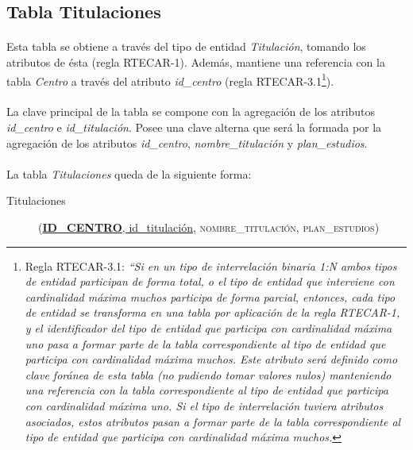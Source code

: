    \subsection{Tabla Titulaciones}

      \paragraph{}Esta tabla se obtiene a través del tipo de entidad
      \textit{Titulación}, tomando los atributos de ésta (regla RTECAR-1).
      Además, mantiene una referencia con la tabla \textit{Centro} a través
      del atributo \textit{id\_centro} (regla RTECAR-3.1\footnote{Regla
      RTECAR-3.1: \textit{``Si en un tipo de interrelación binaria 1:N ambos
      tipos de entidad participan de forma total, o el tipo de entidad que
      interviene con cardinalidad máxima muchos participa de forma parcial,
      entonces, cada tipo de entidad se transforma en una tabla por aplicación
      de la regla RTECAR-1, y el identificador del tipo de entidad que participa
      con cardinalidad máxima uno pasa a formar parte de la tabla
      correspondiente al tipo de entidad que participa con cardinalidad máxima
      muchos. Este atributo será definido como clave foránea de esta tabla (no
      pudiendo tomar valores nulos) manteniendo una referencia con la tabla
      correspondiente al tipo de entidad que participa con cardinalidad máxima
      uno. Si el tipo de interrelación tuviera atributos asociados, estos
      atributos pasan a formar parte de la tabla correspondiente al tipo de
      entidad que participa con cardinalidad máxima muchos.}}).

      \paragraph{}La clave principal de la tabla se compone con la agregación de
      los atributos \textit{id\_centro} e \textit{id\_titulación}. Posee una
      clave alterna que será la formada por la agregación de los atributos
      \textit{id\_centro}, \textit{nombre\_titulación} y
      \textit{plan\_estudios}.

      \paragraph{}La tabla \textit{Titulaciones} queda de la siguiente forma:

      \begin{description}
         \item[Titulaciones] \begin{flushleft}(\underline{\textbf{ID\_CENTRO},
         id\_titulación}, \textsc{nombre\_titulación},
         \textsc{plan\_estudios})\end{flushleft}
      \end{description}
